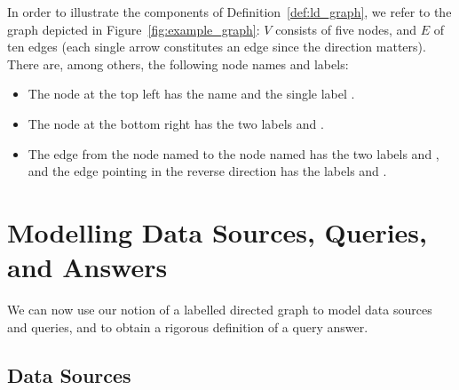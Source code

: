 In order to illustrate the components of Definition~\ref{def:ld_graph},
we refer to the graph depicted in Figure~\ref{fig:example_graph}:
$V$ consists of five nodes, and $E$ of ten edges
(each single arrow constitutes an edge since the direction matters).
There are, among others, the following node names and labels:
%
\begin{itemize}
  \item
    The node at the top left has the name 
    and the single label .
  \item 
    The node at the bottom right has the two labels  and .
  \item 
    The edge from the node named  to the node named 
    has the two labels  and ,
    and the edge pointing in the reverse direction has the labels
     and .
\end{itemize}
%

\section{Modelling Data Sources, Queries, and Answers}
\label{sec:modelling}

We can now use our notion of a labelled directed graph to model
data sources and queries, and to obtain a rigorous definition of a query answer.

\subsection{Data Sources}
\label{subsec:data_sources}

